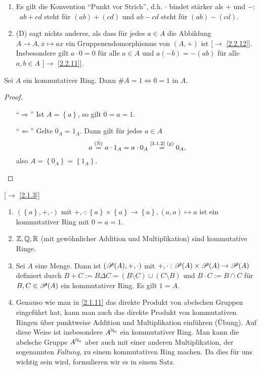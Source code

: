 \documentclass[../../main.tex]{subfiles}
\begin{document}
\begin{bem}
\begin{enumerate}[\normalfont(a)]
\item Es gilt die Konvention "`Punkt vor Strich"', d.h. $\cdot$ bindet stärker als $+$ und $-$: ~$ab+cd$ steht für $(ab)+(cd)$
und $ab-cd$ steht für $(ab)-(cd)$.
\item (D) sagt nichts anderes, als dass für jedes $a\in A$ die Abbildung $A\to A, x\mapsto ax$ ein Gruppenendomorphismus von $(A,+)$ ist [$\to$ \ref{2.2.12}]. Insbesondere gilt $a\cdot 0 = 0$ für alle $a\in A$ und $a(-b)=-(ab)$ für alle $a,b\in A$ [$\to$ \ref{2.2.11}].
\end{enumerate}
\end{bem}

\begin{pro}\label{3.1.3}
Sei $A$ ein kommutativer Ring. Dann $\# A = 1 \iff 0=1$ in $A$.
\end{pro}
\begin{proof}
\begin{itemize}
\item["`$\Longrightarrow$"'] Ist $A=\left\{a\right\}$, so gilt $0=a=1$.
\item["`$\Longleftarrow$"'] Gelte $0_A = 1_A$. Dann gilt für jedes $a\in A$
\[a\overset{\text{(\. N)}}=a\cdot 1_A = a\cdot 0_A \overset{\text{\ref{3.1.2} (g)}}= 0_A,\]
also $A=\left\{0_A\right\}=\left\{1_A\right\}$.
\end{itemize}
\end{proof}

\begin{bsp}\mbox{}[$\to$ \ref{2.1.3}]\label{3.1.4}
\begin{enumerate}[\normalfont(a)]
\item $(\left\{a\right\},+,\cdot)$ mit $+,\cdot:\left\{a\right\}\times\left\{a\right\}\to \left\{a\right\}, (a,a)\mapsto a$ ist ein kommutativer Ring mit $0=a=1$.
\item $\mathbb Z,\mathbb Q,\mathbb R$ (mit gewöhnlicher Addition und Multiplikation) sind kommutative Ringe.
\item Sei $A$ eine Menge. Dann ist $(\mathcal P(A),+,\cdot)$ mit $+,\cdot:\mathcal P(A)\times \mathcal P(A)\to \mathcal P(A)$ definiert durch $B+C:=B\Delta C = (B\setminus C)\cup (C\setminus B)$ und $B\cdot C:=B\cap C$ für $B,C\in\mathcal P(A)$ ein kommutativer Ring. Es gilt $1=A$.
\item Genauso wie man in \ref{2.1.11} das direkte Produkt von abelschen Gruppen eingeführt hat, kann man auch das direkte Produkt von kommutativen Ringen über punktweise Addition und Multiplikation einführen (Übung).
Auf diese Weise ist insbesondere $A^{\mathbb N_0}$ ein kommutativer Ring. Man kann die abelsche Gruppe $A^{\mathbb N_0}$ aber auch mit einer anderen Multiplikation, der sogenannten \emph{Faltung}, zu einem kommutativen Ring machen. Da dies für uns wichtig sein wird, formulieren wir es in einem Satz.
\end{enumerate}
\end{bsp}
\end{document}
